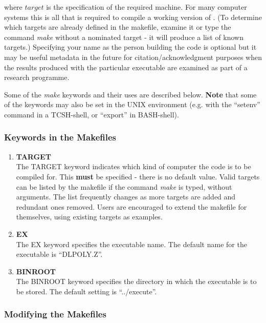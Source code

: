 \noindent where $target$ is the specification of the required
machine.  For many computer systems this is all that is required
to compile a working version of \D.   (To determine which
targets are already defined in the makefile, examine it or type
the command {\sl make} without a nominated target - it will
produce a list of known targets.)  Specifying your name as the
person building the code is optional but it may be useful
metadata in the future for citation/acknowledgment purposes
when the results produced with the particular executable
are examined as part of a research programme.

Some of the {\sl make} keywords and their uses are described below.
{\bf Note} that some of the keywords may also be set in the UNIX
environment (e.g. with the ``setenv'' command in a TCSH-shell, or
``export'' in BASH-shell).

\subsubsection*{Keywords in the Makefiles}

\begin{enumerate}
\item {\bf TARGET} \\
The TARGET keyword indicates which kind of computer the code is to
be compiled for.  This {\bf must} be specified - there is no default
value.  Valid targets can be listed by the makefile if the command
{\sl make} is typed, without arguments.  The list frequently changes
as more targets are added and redundant ones removed.  Users are
encouraged to extend the makefile for themselves, using existing
targets as examples. \\

\item {\bf EX} \\
The EX keyword specifies the executable name.  The default name for
the executable is ``DLPOLY.Z''. \\

\item {\bf BINROOT} \\
The BINROOT keyword specifies the directory in which the executable is
to be stored.  The default setting is ``../execute''.
\end{enumerate}

\subsubsection*{Modifying the Makefiles}

